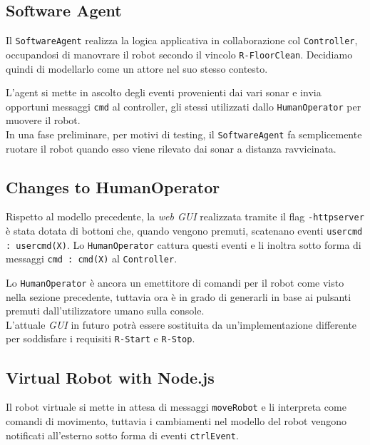 \documentclass{../llncs}
\newcommand{\codescript}[1]{{\mbox{\small{\texttt{#1}}}}\xspace}
\newcommand{\code}[1]{{\color{blue}\small{\texttt{#1}}}}
\begin{document}
\subsection{Software Agent}
Il \texttt{SoftwareAgent} realizza la logica applicativa in collaborazione col \texttt{Controller}, occupandosi di manovrare il robot secondo il vincolo \code{R-FloorClean}. Decidiamo quindi di modellarlo come un attore nel suo stesso contesto.

L'agent si mette in ascolto degli eventi provenienti dai vari sonar e invia opportuni messaggi \codescript{cmd} al controller, gli stessi utilizzati dallo \texttt{HumanOperator} per muovere il robot.\\

In una fase preliminare, per motivi di testing, il \texttt{SoftwareAgent} fa semplicemente ruotare il robot quando esso viene rilevato dai sonar a distanza ravvicinata.\\



\subsection{Changes to HumanOperator}
Rispetto al modello precedente, la \emph{web GUI} realizzata tramite il flag \codescript{-httpserver} è stata dotata di bottoni che, quando vengono premuti, scatenano eventi \codescript{usercmd : usercmd(X)}. Lo \texttt{HumanOperator} cattura questi eventi e li inoltra sotto forma di messaggi \codescript{cmd : cmd(X)} al \texttt{Controller}.

Lo \texttt{HumanOperator} è ancora un emettitore di comandi per il robot come visto nella sezione precedente, tuttavia ora è in grado di generarli in base ai pulsanti premuti dall'utilizzatore umano sulla console.\\



L'attuale \emph{GUI} in futuro potrà essere sostituita da un'implementazione differente per soddisfare i requisiti \code{R-Start} e \code{R-Stop}.

\subsection{Virtual Robot with Node.js}
Il robot virtuale si mette in attesa di messaggi \codescript{moveRobot} e li interpreta come comandi di movimento, tuttavia i cambiamenti nel modello del robot vengono notificati all'esterno sotto forma di eventi \codescript{ctrlEvent}.
\end{document}
